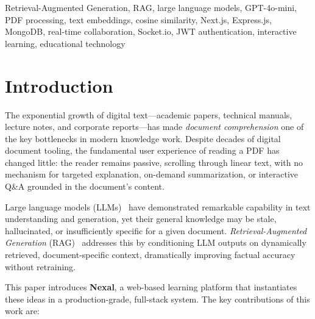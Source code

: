\documentclass[conference]{IEEEtran}
\begin{document}
\begin{IEEEkeywords}
Retrieval-Augmented Generation, RAG, large language models, GPT-4o-mini, PDF processing, text embeddings, cosine similarity, Next.js, Express.js, MongoDB, real-time collaboration, Socket.io, JWT authentication, interactive learning, educational technology
\end{IEEEkeywords}

\section{Introduction}
\label{sec:intro}

The exponential growth of digital text---academic papers, technical manuals, lecture notes, and corporate reports---has made \emph{document comprehension} one of the key bottlenecks in modern knowledge work. Despite decades of digital document tooling, the fundamental user experience of reading a PDF has changed little: the reader remains passive, scrolling through linear text, with no mechanism for targeted explanation, on-demand summarization, or interactive Q\&A grounded in the document's content.

Large language models (LLMs)~\cite{brown2020gpt3,ouyang2022instructgpt} have demonstrated remarkable capability in text understanding and generation, yet their general knowledge may be stale, hallucinated, or insufficiently specific for a given document. \emph{Retrieval-Augmented Generation} (RAG)~\cite{lewis2020rag} addresses this by conditioning LLM outputs on dynamically retrieved, document-specific context, dramatically improving factual accuracy without retraining.

This paper introduces \textbf{Nexal}, a web-based learning platform that instantiates these ideas in a production-grade, full-stack system. The key contributions of this work are:
\end{document}
